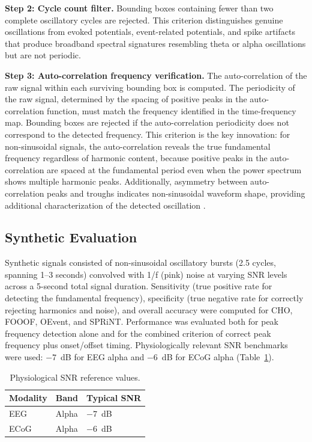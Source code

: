 \documentclass[12pt]{article}
\begin{document}
\textbf{Step 2: Cycle count filter.} Bounding boxes containing fewer than two complete oscillatory cycles are rejected. This criterion distinguishes genuine oscillations from evoked potentials, event-related potentials, and spike artifacts that produce broadband spectral signatures resembling theta or alpha oscillations but are not periodic.

\textbf{Step 3: Auto-correlation frequency verification.} The auto-correlation of the raw signal within each surviving bounding box is computed. The periodicity of the raw signal, determined by the spacing of positive peaks in the auto-correlation function, must match the frequency identified in the time-frequency map. Bounding boxes are rejected if the auto-correlation periodicity does not correspond to the detected frequency. This criterion is the key innovation: for non-sinusoidal signals, the auto-correlation reveals the true fundamental frequency regardless of harmonic content, because positive peaks in the auto-correlation are spaced at the fundamental period even when the power spectrum shows multiple harmonic peaks. Additionally, asymmetry between auto-correlation peaks and troughs indicates non-sinusoidal waveform shape, providing additional characterization of the detected oscillation \citep{cole2017nonsinusoidal}.

\subsection{Synthetic Evaluation}

Synthetic signals consisted of non-sinusoidal oscillatory bursts (2.5 cycles, spanning 1--3 seconds) convolved with 1/f (pink) noise at varying SNR levels across a 5-second total signal duration. Sensitivity (true positive rate for detecting the fundamental frequency), specificity (true negative rate for correctly rejecting harmonics and noise), and overall accuracy were computed for CHO, FOOOF, OEvent, and SPRiNT. Performance was evaluated both for peak frequency detection alone and for the combined criterion of correct peak frequency plus onset/offset timing. Physiologically relevant SNR benchmarks were used: $-7$~dB for EEG alpha and $-6$~dB for ECoG alpha (Table~\ref{tab:snr}).

\begin{table}[ht]
\centering
\caption{Physiological SNR reference values.}
\label{tab:snr}
\begin{tabular}{lll}
\toprule
Modality & Band & Typical SNR \\
\midrule
EEG & Alpha & $-7$~dB \\
ECoG & Alpha & $-6$~dB \\
\bottomrule
\end{tabular}
\end{table}
\end{document}
